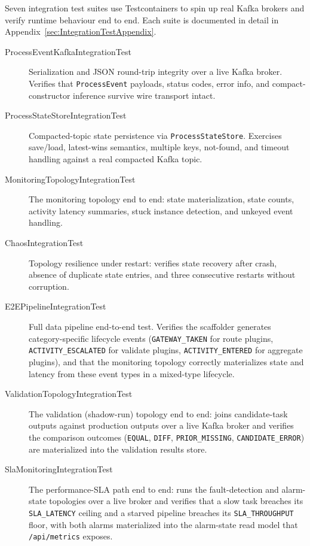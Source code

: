 Seven integration test suites use Testcontainers to spin up real Kafka brokers
and verify runtime behaviour end to end. Each suite is documented in detail in
Appendix~\ref{sec:IntegrationTestAppendix}.

\begin{description}
\item[ProcessEventKafkaIntegrationTest] Serialization and JSON round-trip
integrity over a live Kafka broker. Verifies that \texttt{ProcessEvent}
payloads, status codes, error info, and compact-constructor inference survive
wire transport intact.

\item[ProcessStateStoreIntegrationTest] Compacted-topic state persistence via
\texttt{ProcessStateStore}. Exercises save/load, latest-wins semantics,
multiple keys, not-found, and timeout handling against a real compacted
Kafka topic.

\item[MonitoringTopologyIntegrationTest] The monitoring topology end to end:
state materialization, state counts, activity latency summaries, stuck
instance detection, and unkeyed event handling.

\item[ChaosIntegrationTest] Topology resilience under restart: verifies state
recovery after crash, absence of duplicate state entries, and three
consecutive restarts without corruption.

\item[E2EPipelineIntegrationTest] Full data pipeline end-to-end test. Verifies
the scaffolder generates category-specific lifecycle events
(\texttt{GATEWAY\_TAKEN} for route plugins, \texttt{ACTIVITY\_ESCALATED} for
validate plugins, \texttt{ACTIVITY\_ENTERED} for aggregate plugins), and that
the monitoring topology correctly materializes state and latency from these
event types in a mixed-type lifecycle.

\item[ValidationTopologyIntegrationTest] The validation (shadow-run) topology
end to end: joins candidate-task outputs against production outputs over a live
Kafka broker and verifies the comparison outcomes (\texttt{EQUAL},
\texttt{DIFF}, \texttt{PRIOR\_MISSING}, \texttt{CANDIDATE\_ERROR}) are
materialized into the validation results store.

\item[SlaMonitoringIntegrationTest] The performance-SLA path end to end: runs the
fault-detection and alarm-state topologies over a live broker and verifies that a
slow task breaches its \texttt{SLA\_LATENCY} ceiling and a starved pipeline
breaches its \texttt{SLA\_THROUGHPUT} floor, with both alarms materialized into the
alarm-state read model that \texttt{/api/metrics} exposes.
\end{description}

